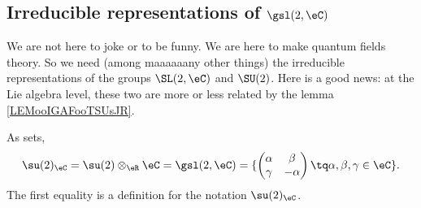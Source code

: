\subsection{Irreducible representations of \texorpdfstring{$\gsl(2,\eC)$}{sl(2,C)}}

We are not here to joke or to be funny. We are here to make quantum fields theory. So we need (among maaaaaany other things) the irreducible representations of the groups \( \SL(2,\eC)\) and \( \SU(2)\). Here is a good news: at the Lie algebra level, these two are more or less related by the lemma \ref{LEMooIGAFooTSUsJR}.

\begin{lemma}     \label{LEMooVEJZooUVNdmE}
	As sets,
	\begin{equation}
		\su(2)_{\eC}=\su(2)\otimes_{\eR}\eC=\gsl(2,\eC)=\{ \begin{pmatrix}
			\alpha & \beta   \\
			\gamma & -\alpha
		\end{pmatrix}\tq \alpha,\beta,\gamma\in \eC\}.
	\end{equation}
	The first equality is a definition for the notation \( \su(2)_{\eC}\).
\end{lemma}

